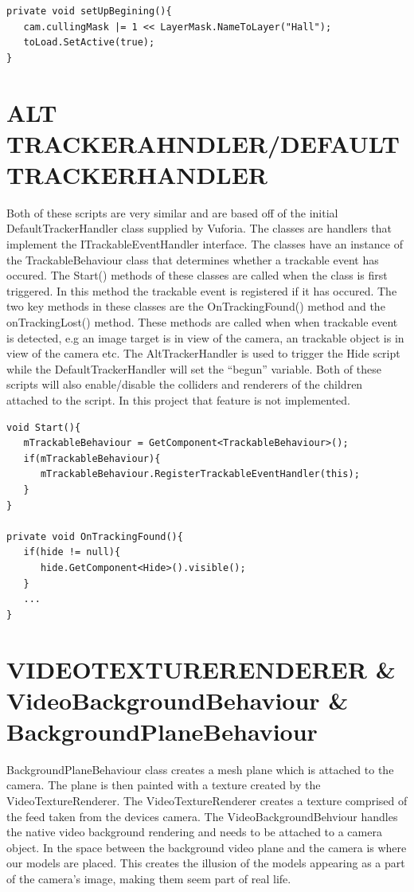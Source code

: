 \begin{lstlisting}
private void setUpBegining(){
   cam.cullingMask |= 1 << LayerMask.NameToLayer("Hall");
   toLoad.SetActive(true);
}
\end{lstlisting}

\section{ALT TRACKERAHNDLER/DEFAULTTRACKERHANDLER}
Both of these scripts are very similar and are based off of the initial DefaultTrackerHandler class supplied by Vuforia. The classes are handlers that implement the ITrackableEventHandler interface. The classes have an instance of the TrackableBehaviour class that determines whether a trackable event has occured. The Start() methods of these classes are called when the class is first triggered. In this method the trackable event is registered if it has occured. The two key methods in these classes are the OnTrackingFound() method and the onTrackingLost() method. These methods are called when when trackable event is detected, e.g an image target is in view of the camera, an trackable object is in view of the camera etc. The AltTrackerHandler is used to trigger the Hide script while the DefaultTrackerHandler will set the “begun” variable. Both of these scripts will also enable/disable the colliders and renderers of the children attached to the script. In this project that feature is not implemented.

\begin{lstlisting}
void Start(){
   mTrackableBehaviour = GetComponent<TrackableBehaviour>();
   if(mTrackableBehaviour){
      mTrackableBehaviour.RegisterTrackableEventHandler(this);
   }
}

private void OnTrackingFound(){
   if(hide != null){
      hide.GetComponent<Hide>().visible();
   }
   ...
}
\end{lstlisting}

\section{VIDEOTEXTURERENDERER \& VideoBackgroundBehaviour \& BackgroundPlaneBehaviour}
BackgroundPlaneBehaviour class creates a mesh plane which is attached to the camera. The plane is then painted with a texture created by the VideoTextureRenderer. The VideoTextureRenderer creates a texture comprised of the feed taken from the devices camera. The VideoBackgroundBehviour handles the native video background rendering and needs to be attached to a camera object.
In the space between the background video plane and the camera is where our models are placed. This creates the illusion of the models appearing as a part of the camera's image, making them seem part of real life.

